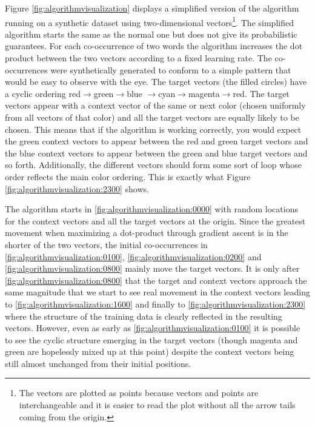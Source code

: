 Figure \ref{fig:algorithmvisualization} displays a simplified version of the 
\modelname{} algorithm running on a synthetic dataset using two-dimensional 
vectors\footnote{The vectors are plotted as points because vectors and points
are interchangeable and it is easier to read the plot without all the arrow 
tails coming from the origin.}. The simplified algorithm
starts the same as the normal one but does not give its probabilistic 
guarantees. For each co-occurrence of two words the algorithm increases the dot
product between the two vectors according to a fixed learning rate. The 
co-occurrences were synthetically generated to conform to a simple pattern
that would be easy to observe with the eye. The target vectors (the filled
circles) have a cyclic ordering red$\rightarrow$green$\rightarrow$blue
$\rightarrow$cyan$\rightarrow$magenta$\rightarrow$red. The target vectors appear
with a context vector of the same or next color (chosen uniformly from all
vectors of that color) and all the target vectors are equally likely to be 
chosen. This means that if the algorithm is working correctly, you would expect
the green context vectors to appear between the red and green target vectors and
the blue context vectors to appear between the green and blue target vectors and
so forth. Additionally, the different vectors should form some sort of loop
whose order reflects the main color ordering. This is exactly what Figure 
\ref{fig:algorithmvisualization:2300} shows.

The algorithm starts in \ref{fig:algorithmvisualization:0000} with random 
locations for the context vectors and all the target vectors at the origin. 
Since the greatest movement when maximizing a dot-product through gradient 
ascent is in the shorter of the two vectors, the initial co-occurrences in 
\ref{fig:algorithmvisualization:0100}, \ref{fig:algorithmvisualization:0200}
and \ref{fig:algorithmvisualization:0800} mainly move the target vectors. It is
only after \ref{fig:algorithmvisualization:0800} that the target and context
vectors approach the same magnitude that we start to see real movement in the
context vectors leading to \ref{fig:algorithmvisualization:1600} and finally
to \ref{fig:algorithmvisualization:2300} where the structure of the training 
data is clearly reflected in the resulting vectors. However, even as early
as \ref{fig:algorithmvisualization:0100} it is possible to see the cyclic 
structure emerging in the target vectors (though magenta and green are 
hopelessly mixed up at this point) despite the context vectors being still 
almost unchanged from their initial positions.


